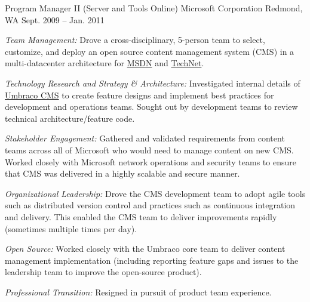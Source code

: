 \begin{cventries}
\cventry 
{Program Manager II (Server and Tools Online)}
{Microsoft Corporation}
{Redmond, WA}
{Sept. 2009 – Jan. 2011}
{ %
\begin{cvitems}
\item {\emph{Team Management:} Drove a cross-disciplinary, 5-person team to select, customize, and deploy an open source content management system (CMS) in a multi-datacenter architecture for \href{https://msdn.microsoft.com}{MSDN} and \href{https://technet.microsoft.com}{TechNet}.}
\item {\emph{Technology Research and Strategy \& Architecture:} Investigated internal details of \href{https://umbraco.com}{Umbraco CMS} to create feature designs and implement best practices for development and operations teams. Sought out by development teams to review technical architecture/feature code.}
\item {\emph{Stakeholder Engagement:} Gathered and validated requirements from content teams across all of Microsoft who would need to manage content on new CMS. Worked closely with Microsoft network operations and security teams to ensure that CMS was delivered in a highly scalable and secure manner.}
\item {\emph{Organizational Leadership:} Drove the CMS development team to adopt agile tools such as distributed version control and practices such as continuous integration and delivery. This enabled the CMS team to deliver improvements rapidly (sometimes multiple times per day).}
\item {\emph{Open Source:} Worked closely with the Umbraco core team to deliver content management implementation (including reporting feature gaps and issues to the leadership team to improve the open-source product).}
\item {\emph{Professional Transition:} Resigned in pursuit of product team experience.}
\end{cvitems}
}



\end{cventries}
